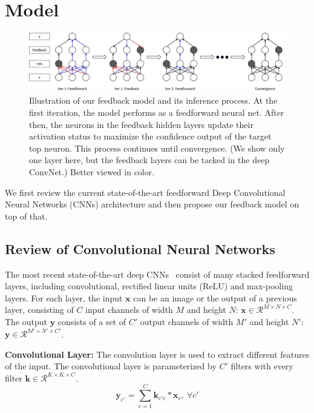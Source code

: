 \section{Model}
\label{sec:model}

\setlength{\tabcolsep}{2pt}
\begin{figure}
\begin{center}
\includegraphics[width=0.95\linewidth]{figs/model/model}
\caption{Illustration of our feedback model and its inference process. At the first iteration, the model performs as a feedforward neural net. After then, the neurons in the feedback hidden layers update their activation status to maximize the confidence output of the target top neuron. This process continues until convergence. (We show only one layer here, but the feedback layers can be tacked in the deep ConvNet.) Better viewed in color.}
\label{fig:model}
\end{center}
\end{figure}

We first review the current state-of-the-art feedforward Deep Convolutional Neural Networks (CNNs) architecture and then propose our feedback model on top of that. 

\subsection{Review of Convolutional Neural Networks}
The most recent state-of-the-art deep CNNs~\cite{Simonyan2014Very} consist of many stacked feedforward layers, including convolutional, rectified linear units (ReLU) and max-pooling layers. For each layer, the input $\mathbf{x}$ can be an image or the output of a previous layer, consisting of $C$ input channels of width $M$ and height $N$: $\mathbf{x} \in \mathcal{R}^{M \times N \times C}$. The output $\mathbf{y}$ consists of a set of $C'$ output channels of width $M'$ and height $N'$: $\mathbf{y} \in \mathcal{R}^{M' \times N' \times C'}$. 

\textbf{Convolutional Layer:} 
The convolution layer is used to extract different features of the input. The convolutional layer is parameterized by $C'$ filters with every filter $\mathbf{k} \in \mathcal{R}^{K \times K \times C}$.
\begin{equation}
\mathbf{y}_{c'} = \sum_{c=1}^C \mathbf{k}_{c'c} * \mathbf{x}_c,\ \forall c'
\end{equation}

